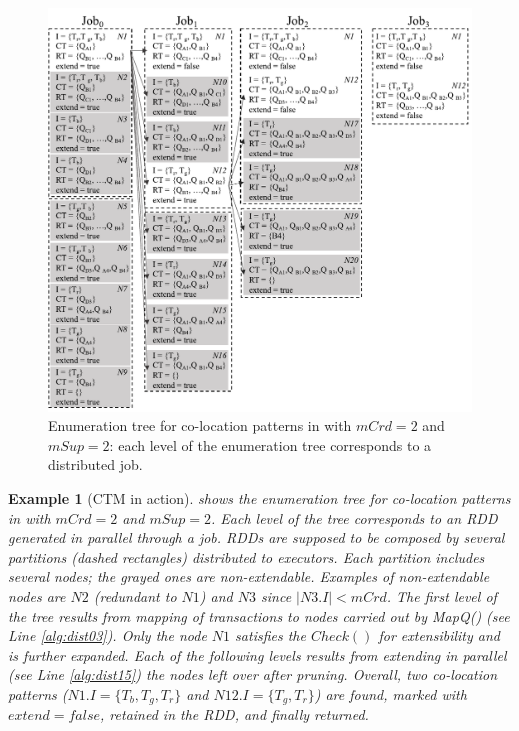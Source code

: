 \documentclass[
]{ceurart}
\renewcommand{\sf}[1]{\textsf{\textup{#1}}}
\newtheorem{example}{Example}
\begin{document}
\begin{figure}[t]
\centering
\includegraphics[scale=.5]{ctm.pdf}
\caption{Enumeration tree for co-location patterns in  with $mCrd=2$ and $mSup=2$: each level of the enumeration tree corresponds to a distributed job.}
\label{fig:ctminaction}
\end{figure}
\begin{example}[CTM in action]
 shows the enumeration tree for co-location patterns in  with $mCrd=2$ and $mSup=2$.
Each level of the tree corresponds to an RDD generated in parallel through a job.
RDDs are supposed to be composed by several partitions (dashed rectangles) distributed to executors.
Each partition includes several nodes; the grayed ones are non-extendable.
Examples of non-extendable nodes are $N2$ (redundant to $N1$) and $N3$ since $|N3.I| < mCrd$.
The first level of the tree results from mapping of transactions to nodes carried out by \sf{MapQ()} (see  Line \ref{alg:dist03}).
Only the node $N1$ satisfies the $Check()$ for extensibility and is further expanded.
Each of the following levels results from extending in parallel (see  Line \ref{alg:dist15}) the nodes left over after pruning.
Overall, two co-location patterns ($N1.I = \{T_b, T_g, T_r\}$ and $N12.I = \{T_g,T_r\}$) are found, marked with $extend=false$, retained in the RDD, and finally returned.
\end{example}
\end{document}
